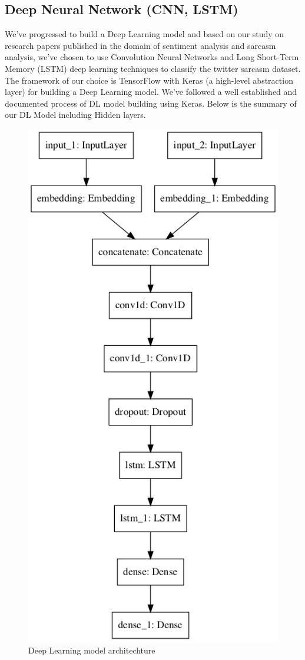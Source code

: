 \documentclass[conference]{IEEEtran}
\begin{document}
\subsection{Deep Neural Network (CNN, LSTM)}
We’ve progressed to build a Deep Learning model and based on our study on research papers published in the domain of sentiment analysis and sarcasm analysis, we’ve chosen to use Convolution Neural Networks and Long Short-Term Memory (LSTM) deep learning techniques to classify the twitter sarcasm dataset.
The framework of our choice is TensorFlow with Keras (a high-level abstraction layer) for building a Deep Learning model. We’ve followed a well established and documented process of DL model building using Keras. Below is the summary of our DL Model including Hidden layers.
\begin{figure}[htbp]
\centerline{\includegraphics[width=0.6\columnwidth]{model.PNG}}
\caption{Deep Learning model architechture}
\label{fig1}
\end{figure}
\end{document}
